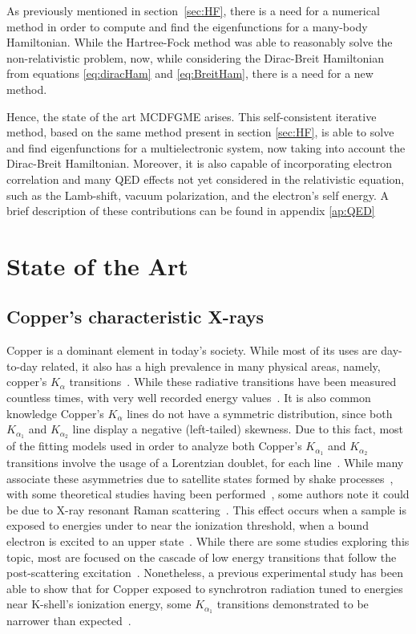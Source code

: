 As previously mentioned in section~\ref{sec:HF}, there is a need for a numerical method in order to compute and find the eigenfunctions for a many-body Hamiltonian. While the Hartree-Fock method was able to reasonably solve the non-relativistic problem, now, while considering the Dirac-Breit Hamiltonian from equations \eqref{eq:diracHam} and \eqref{eq:BreitHam}, there is a need for a new method.

Hence, the state of the art \gls{MCDFGME} arises. This self-consistent iterative method, based on the same method present in section \ref{sec:HF}, is able to solve and find eigenfunctions for a multielectronic system, now taking into account the Dirac-Breit Hamiltonian. Moreover, it is also capable of incorporating electron correlation and many QED effects not yet considered in the relativistic equation, such as the Lamb-shift, vacuum polarization, and the electron's self energy.
A brief description of these contributions can be found in  appendix \ref{ap:QED}




\section{State of the Art}


\subsection{Copper's characteristic X-rays}
Copper is a dominant element in today's society. While most of its uses are day-to-day related, it also has a high prevalence in many physical areas, namely, copper's $K_\alpha$ transitions~\cite{Nguyen2022}. While these radiative transitions have been measured countless times, with very well recorded energy values~\cite{Melia2020,Melia2019,Sorum1987,Bremer1982,Deutsch1995}.
It is also common knowledge Copper's $K_\alpha$ lines do not have a symmetric distribution, since both $K_{\alpha_1}$ and $K_{\alpha_2}$ line display a negative (left-tailed) skewness. Due to this fact, most of the fitting models used in order to analyze both Copper's $K_{\alpha_1}$ and $K_{\alpha_2}$ transitions involve the usage of a Lorentzian doublet, for each line~\cite{Ito2016,Berger1986}.
While many associate these asymmetries due to satellite states formed by shake processes~\cite{Galambosi2003,Nguyen2022}, with some theoretical studies having been performed~\cite{Chantler2009}, some authors note it could be due to X-ray resonant Raman scattering~\cite{Galambosi2003}. This effect occurs when a sample is exposed to energies under to near the ionization threshold, when a bound electron is excited to an upper state~\cite{RamanBook}.
While there are some studies exploring this topic, most are focused on the cascade of low energy transitions that follow the post-scattering excitation~\cite{Carra1995}. Nonetheless, a previous experimental study has been able to show that for Copper exposed to synchrotron radiation tuned to energies near K-shell's ionization energy, some $K_{\alpha_1}$ transitions demonstrated to be narrower than expected~\cite{Eisenberger1976}.








